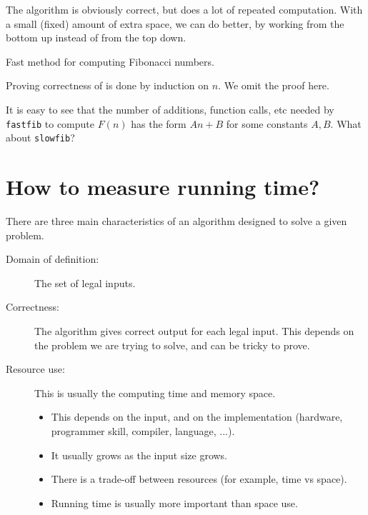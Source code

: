 The algorithm  is obviously correct, but does a lot of repeated computation. 
With a small (fixed) amount of extra space, we can do better, 
by working from the bottom up instead of from the top down.

\begin{algorithm}[H]
  \caption{Fast method for computing Fibonacci numbers.}
    \label{alg:fastfib}
\begin{algorithmic}[1]
	\Else
		 	
		  
		\EndFor
	\EndIf
	\State {}
\EndFunction
\end{algorithmic}
\end{algorithm}
 
Proving correctness of  is done by induction on $n$.  We omit the proof here.
\begin{Boxample}[7]
It is easy to see that the number of additions, function calls, etc needed by 
\texttt{fastfib} to compute $F(n)$ has the form $An + B$ for some constants $A, B$.
What about \texttt{slowfib}?
\end{Boxample}


\chapter{How to measure running time?} %
There are three main characteristics of an algorithm designed to solve a given problem.
\begin{description}
	\item[Domain of definition:] The set of legal inputs. 
	\item[Correctness:] The algorithm gives correct output for each legal input. 
	This depends on the problem we are trying to solve, and can be tricky to prove. 
	\item[Resource use:] This is usually the computing time and memory space. 
	\begin{itemize} 
		\item This depends on the input, and on the implementation 
		(hardware, programmer skill, compiler, language, ...). 
		\item It usually grows as the input size grows. 
		\item There is a trade-off between resources (for example, time vs space). 
		\item Running time is usually more important than space use. 
	\end{itemize}
\end{description}

